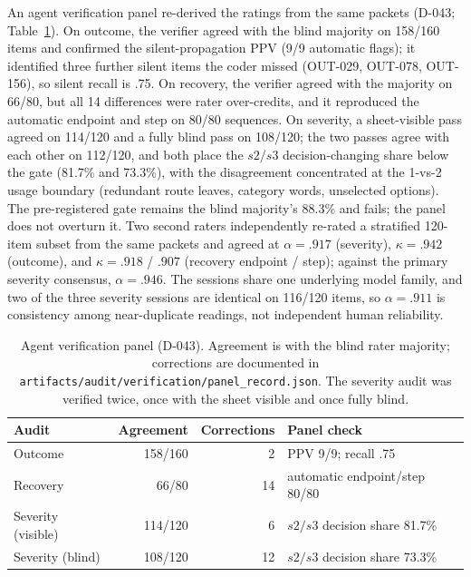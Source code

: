\documentclass[a4paper,fleqn]{cas-sc}
\begin{document}
An agent verification panel re-derived the ratings from the same packets (D-043; Table~\ref{tab:panel}). On outcome, the
verifier agreed with the blind majority on 158/160 items and confirmed the silent-propagation PPV
(9/9 automatic flags); it identified three further silent items the coder missed (OUT-029, OUT-078,
OUT-156), so silent recall is .75. On recovery, the verifier agreed with the majority on 66/80,
but all 14 differences were rater over-credits, and it reproduced the automatic endpoint and step
on 80/80 sequences. On severity, a sheet-visible pass agreed on 114/120 and a fully blind pass on
108/120; the two passes agree with each other on 112/120, and both place the $s2/s3$
decision-changing share below the gate (81.7\% and 73.3\%), with the disagreement concentrated at
the 1-vs-2 usage boundary (redundant route leaves, category words, unselected options). The
pre-registered gate remains the blind majority's 88.3\% and fails; the panel does not overturn it.
Two second raters independently re-rated a stratified 120-item subset from the same packets and
agreed at $\alpha = .917$ (severity), $\kappa = .942$ (outcome), and $\kappa = .918$ / $.907$
(recovery endpoint / step); against the primary severity consensus, $\alpha = .946$. The sessions
share one underlying model family, and two of the three severity sessions are identical on
116/120 items, so $\alpha = .911$ is consistency among near-duplicate readings, not independent
human reliability.

\begin{table}[pos=htbp]
  \centering
  \caption{Agent verification panel (D-043). Agreement is with the blind rater majority;
  corrections are documented in \texttt{artifacts/audit/verification/panel\_record.json}. The
  severity audit was verified twice, once with the sheet visible and once fully blind.}
  \label{tab:panel}
  \small
  \begin{tabular}{lrrl}
    \toprule
    \textbf{Audit} & \textbf{Agreement} & \textbf{Corrections} & \textbf{Panel check} \\
    \midrule
    Outcome            & 158/160 & 2  & PPV 9/9; recall .75 \\
    Recovery           & 66/80   & 14 & automatic endpoint/step 80/80 \\
    Severity (visible) & 114/120 & 6  & $s2/s3$ decision share 81.7\% \\
    Severity (blind)   & 108/120 & 12 & $s2/s3$ decision share 73.3\% \\
    \bottomrule
  \end{tabular}
\end{table}
\end{document}
